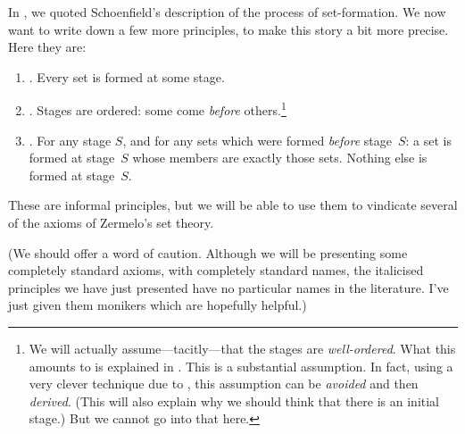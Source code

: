 \documentclass[../../../include/open-logic-section]{subfiles}
\begin{document}
	
In , we quoted Schoenfield's
description of the process of set-formation. We now want to write down
a few more principles, to make this story a bit more precise. Here
they are:
\begin{enumerate}
\item[] \stageshier. Every set is formed at some stage.
\item[] \stagesord. Stages are ordered: some come \emph{before}
others.\footnote{We will actually assume---tacitly---that the stages
are \emph{well-ordered}. What this amounts to is explained in
. This is a substantial assumption. In fact,
using a very clever technique due to \citet{Scott1974}, this
assumption can be \emph{avoided} and then \emph{derived}. (This will
also explain why we should think that there is an initial stage.) But
we cannot go into that here.} 
\item[] \stagesacc. For any stage $S$, and for any sets which were
formed \emph{before} stage~$S$: a set is formed at stage~$S$ whose
members are exactly those sets. Nothing else is formed at stage~$S$.
\end{enumerate}
These are informal principles, but we will be able to use them to
vindicate several of the axioms of Zermelo's set theory. 

(We should offer a word of caution. Although we will be presenting some
completely standard axioms, with completely standard names, the
italicised principles we have just presented have no particular names
in the literature. I've just given them monikers which are hopefully
helpful.)
\end{document}
